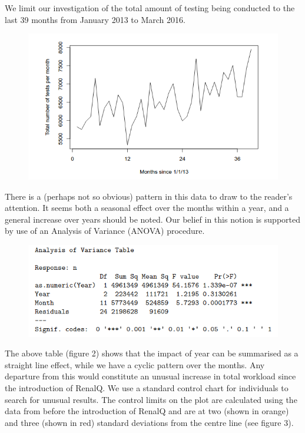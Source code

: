 \documentclass[11pt]{article}
\begin{document}
We limit our investigation of the total amount of testing being conducted to the last 39 months from January 2013 to March 2016.\\

\begin{figure}[htp]
\centering
\includegraphics[scale=0.50]{Fig1.png}
\caption{}
\label{}
\end{figure}

There is a (perhaps not so obvious) pattern in this data to draw to the reader's attention. It seems both a seasonal effect over the months within a year, and a general increase over years should be noted.  Our belief in this notion is supported by use of an Analysis of Variance (ANOVA) procedure. \\

\begin{figure}[htp]
\centering
\includegraphics[scale=0.50]{fig2.png}
\caption{}
\label{}
\end{figure}

The above table (figure 2) shows that the impact of year can be summarised as a straight line effect, while we have a cyclic pattern over the months. Any departure from this would constitute an unusual increase in total workload since the introduction of RenalQ. We use a standard control chart for individuals to search for unusual results. The control limits on the plot are calculated using the data from before the introduction of RenalQ and are at two (shown in orange) and three (shown in red) standard deviations from the centre line (see figure 3).\\
\end{document}
